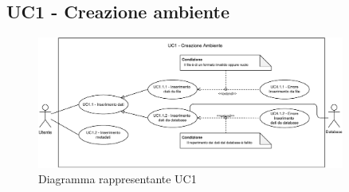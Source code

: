 \newpage
\subsection{UC1 - Creazione ambiente}
\label{subsec:uc1}


\begin{figure}[h]
    \centering
    \includegraphics[width=0.9\textwidth]{componenti/casi-duso/diagrammi/UC1.pdf}
    \caption{Diagramma rappresentante UC1}
    \label{fig:UC1}
\end{figure}


